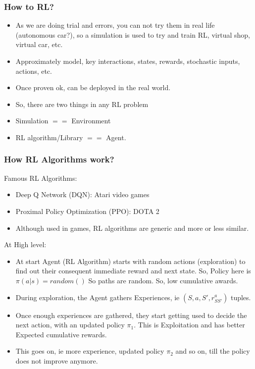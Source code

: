\begin{frame}[fragile]\frametitle{How to RL?}

\begin{itemize}
\item As we are doing trial and errors, you can not try them in real life (autonomous car?), so a simulation is used to try and train RL, virtual shop, virtual car, etc.
\item Approximately model, key interactions, states, rewards, stochastic inputs, actions, etc.
\item Once proven ok, can be deployed in the real world.
\item So, there are two things in any RL problem
\item Simulation $==$ Environment
\item RL algorithm/Library $==$ Agent.
\end{itemize}
\end{frame}

\begin{frame}[fragile]\frametitle{How RL Algorithms work?}

Famous RL Algorithms:
\begin{itemize}
\item Deep Q Network (DQN): Atari video games
\item Proximal Policy Optimization (PPO): DOTA 2
\item Although used in games, RL algorithms are generic and more or less similar.
\end{itemize}

At High level:
\begin{itemize}
\item At start Agent (RL Algorithm) starts with random actions (exploration) to find out their consequent immediate reward and next state. So, Policy here is $\pi(a|s) = random()$ So paths are random. So, low cumulative awards.
\item During exploration, the Agent gathers Experiences, ie $(S,a,S',r_{SS'}^a)$ tuples.
\item Once enough experiences are gathered, they start getting used to decide the next action, with an updated policy $\pi_1$. This is Exploitation and has better Expected cumulative rewards.
\item This goes on, ie more experience, updated policy $\pi_2$ and so on, till the policy does not improve anymore.
\end{itemize}
\end{frame}

